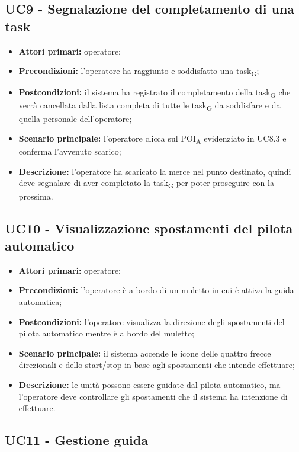 \subsection{UC9 - Segnalazione del completamento di una task}
\begin{itemize}
	\item 	\textbf{Attori primari:} operatore;
	\item 	\textbf{Precondizioni:} l'operatore ha raggiunto e soddisfatto una task\textsubscript{G};
	\item 	\textbf{Postcondizioni:} il sistema ha registrato il completamento della task\textsubscript{G} che verrà cancellata dalla lista completa di tutte le task\textsubscript{G} da soddisfare e da quella personale dell'operatore;
	\item 	\textbf{Scenario principale:} l'operatore clicca sul POI\textsubscript{A} evidenziato in UC8.3 e conferma l'avvenuto scarico;
	\item 	\textbf{Descrizione:} l'operatore ha scaricato la merce nel punto destinato, quindi deve segnalare di aver completato la task\textsubscript{G} per poter proseguire con la prossima.

\end{itemize}

\subsection{UC10 - Visualizzazione spostamenti del pilota automatico}
\begin{itemize}
	\item 	\textbf{Attori primari:} operatore;
	\item 	\textbf{Precondizioni:} l'operatore è a bordo di un muletto in cui è attiva la guida automatica;
	\item 	\textbf{Postcondizioni:} l'operatore visualizza la direzione degli spostamenti del pilota automatico mentre è a bordo del muletto;
	\item 	\textbf{Scenario principale:} il sistema accende le icone delle quattro frecce direzionali e dello start/stop in base agli spostamenti che intende effettuare;
	\item 	\textbf{Descrizione:} le unità possono essere guidate dal pilota automatico, ma l'operatore deve controllare gli spostamenti che il sistema ha intenzione di effettuare.

\end{itemize}
 
\subsection{UC11 - Gestione guida}

